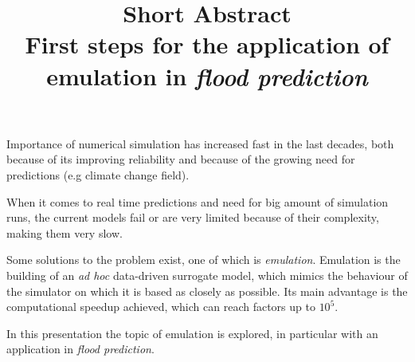 \documentclass{article}
\title{%
  \bf{Short Abstract}\\%
  \large First steps for the application of\\
  emulation in \emph{flood prediction}}
\author{}
\date{}
\begin{document}
\maketitle
\thispagestyle{fancy}

Importance of numerical simulation has increased fast in the last decades, both because of its improving reliability and because of the growing need for predictions (e.g climate change field).

When it comes to real time predictions and need for big amount of simulation runs, the current models fail or are very limited because of their complexity, making them very slow.

Some solutions to the problem exist, one of which is \emph{emulation}. 
Emulation is the building of an \emph{ad hoc} data-driven surrogate model, which mimics the behaviour of the simulator on which it is based as closely as possible. Its main advantage is the computational speedup achieved, which can reach factors up to $10^5$.

In this presentation the topic of emulation is explored, in particular with an application in \emph{flood prediction}.
\end{document}
